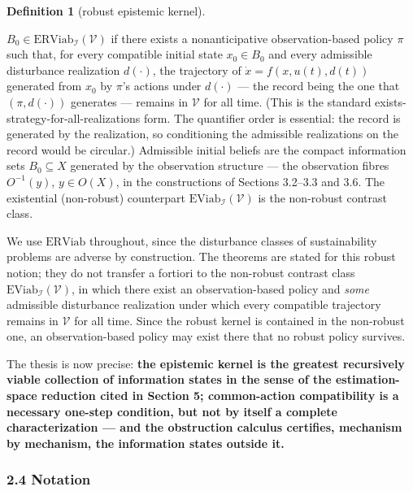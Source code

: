 \documentclass[10pt,twocolumn]{article}
\theoremstyle{definition}
\newtheorem{definition}{Definition}
\begin{document}
\begin{definition}[robust epistemic kernel]\label{calc-def:kernel}

\(B_0 \in \mathrm{ERViab}_{\mathcal{I}}(\mathcal{V})\) if there exists a
nonanticipative observation-based policy \(\pi\) such that, for every
compatible initial state \(x_0 \in B_0\) and every admissible
disturbance realization \(d(\cdot)\), the trajectory of
\(\dot x = f(x, u(t), d(t))\) generated from \(x_0\) by \(\pi\)'s
actions under \(d(\cdot)\) --- the record being the one that
\((\pi, d(\cdot))\) generates --- remains in \(\mathcal{V}\) for all
time. (This is the standard exists-strategy-for-all-realizations form. The quantifier order is essential: the record is generated by the realization, so conditioning the admissible realizations on the record would be circular.) Admissible initial
beliefs are the compact information sets \(B_0 \subseteq X\) generated
by the observation structure --- the observation fibres \(O^{-1}(y)\),
\(y \in O(X)\), in the constructions of Sections 3.2--3.3 and 3.6. The existential (non-robust) counterpart \(\mathrm{EViab}_{\mathcal{I}}(\mathcal{V})\) is the non-robust contrast class.

\end{definition}

We use \(\mathrm{ERViab}\) throughout, since the disturbance classes of sustainability problems are adverse by construction. The theorems are stated for this robust notion; they do not transfer a fortiori to the non-robust contrast class \(\mathrm{EViab}_{\mathcal{I}}(\mathcal{V})\), in which there exist an observation-based policy and \emph{some} admissible disturbance realization under which every compatible trajectory remains in \(\mathcal{V}\) for all time. Since the robust kernel is contained in the non-robust one, an observation-based policy may exist there that no robust policy survives.

The thesis is now precise:
\textbf{the epistemic kernel is the greatest recursively viable collection of information states in the sense of the estimation-space reduction cited in Section 5; common-action compatibility is a necessary one-step condition, but not by itself a
complete characterization --- and the obstruction calculus certifies,
mechanism by mechanism, the information states outside it.}

\subsubsection{2.4 Notation}\label{calc-notation}
\end{document}
